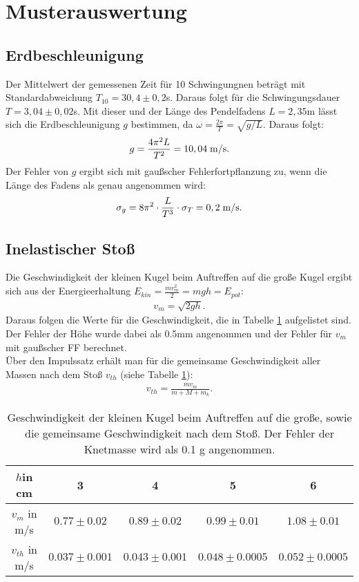 \section{Musterauswertung}

\subsection*{Erdbeschleunigung}
Der Mittelwert der gemessenen Zeit für 10 Schwingungnen beträgt mit Standardabweichung $T_{10}= 30,4\pm 0,2$\;s. Daraus folgt für die Schwingungsdauer $T=3,04\pm 0,02$\;s. Mit dieser und der Länge des Pendelfadens $L=2,35$\;m lässt sich die Erdbeschleunigung $g$ bestimmen, da $\omega=\frac{2\pi}{T}=\sqrt{g/L}$. Daraus folgt:\\
\begin{align*}
g=\frac{4\pi^2 L}{T^2}=10,04\; \rm{m/s}.
\end{align*} 
Der Fehler von $g$ ergibt sich mit gaußscher Fehlerfortpflanzung zu, wenn die Länge des Fadens als genau angenommen wird:
\begin{align*}
\sigma_{g}=8\pi^{2}\cdot\frac{L}{T^3}\cdot\sigma_{T}=0,2\;\rm{m/s}.
\end{align*}
\subsection*{Inelastischer Stoß}
Die Geschwindigkeit der kleinen Kugel beim Auftreffen auf die große Kugel ergibt sich aus der Energieerhaltung $E_{kin}=\frac{mv_{m}^{2}}{2}=mgh=E_{pot}$:\\
\begin{align*}
v_{m}=\sqrt{2gh}.
\end{align*}
Daraus folgen die Werte für die Geschwindigkeit, die in Tabelle \ref{vm} aufgelistet sind. Der Fehler der Höhe wurde dabei als 0.5\;mm angenommen und der Fehler für $v_{m}$ mit gaußscher FF berechnet.\\
Über den Impulssatz erhält man für die gemeinsame Geschwindigkeit aller Massen nach dem Stoß $v_{th}$ (siehe Tabelle \ref{vm}):
\begin{align*}
v_{th}=\frac{mv_{m}}{m+M+m_{k}}.
\end{align*}

\begin{table}[b]
\begin{center}
\begin{tabular}{|c|c|c|c|c|}
\hline
$h$in cm&3&4&5&6\\
\hline
$v_{m}$ in m/s&$0.77\pm 0.02$&$0.89\pm 0.02$&$0.99\pm 0.01$&$1.08\pm 0.01$\\
\hline
$v_{th}$ in m/s& $0.037\pm 0.001$&$0.043\pm 0.001 $ &$0.048\pm 0.0005$ &$0.052\pm 0.0005 $ \\
\hline
\end{tabular}
\end{center}
\caption{Geschwindigkeit der kleinen Kugel beim Auftreffen auf die große, sowie die gemeinsame Geschwindigkeit nach dem Stoß. Der Fehler der Knetmasse wird als 0.1 g angenommen.\label{vm}}
\end{table}

